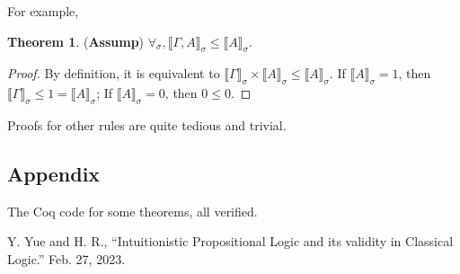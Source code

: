 \documentclass{article}
\theoremstyle{definition}
\newtheorem{theorem}{Theorem}[section]
\newcommand{\brs}[1]{\llbracket#1\rrbracket_\sigma}
\begin{document}
For example,

\begin{theorem}
    (\textbf{Assump}) $\forall_\sigma, \brs{\Gamma, A} \leq \brs{A}$.
\end{theorem}

\begin{proof}
    By definition, it is equivalent to $\brs{\Gamma} \times \brs{A} \leq \brs{A}$.
    If $\brs{A} = 1$, then $\brs{\Gamma}\leq 1 = \brs{A}$;
    If $\brs{A} = 0$, then $0\leq 0$.
\end{proof}

Proofs for other rules are quite tedious and trivial.

\subsection*{Appendix}
The Coq code for some theorems, all verified.


\begin{thebibliography}{9}
     Y. Yue and H. R., “Intuitionistic Propositional Logic and its validity in Classical Logic.” Feb. 27, 2023.
\end{thebibliography}
\end{document}
